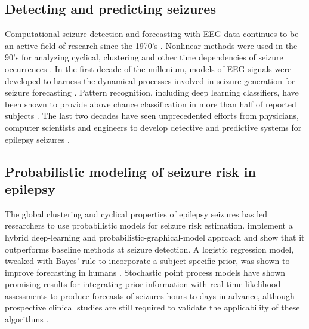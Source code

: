 \subsection{Detecting and predicting seizures}
Computational seizure detection and forecasting with EEG data continues to be an active field of research since the 1970's \cite{mormann2007seizure, kuhlmann2018seizure}. Nonlinear methods were used in the 90's for analyzing cyclical, clustering and other time dependencies of seizure occurrences \cite{iasemidis1994time}. In the first decade of the millenium, models of EEG signals were developed to harness the dynamical processes involved in seizure generation for seizure forecasting \cite{kalitzin2005electrical}. Pattern recognition, including deep learning classifiers, have been shown to provide above chance classification in more than half of reported subjects \cite{mirowski2008comparing,mormann2016seizure}. The last two decades have seen unprecedented efforts from physicians, computer scientists and engineers to develop detective and predictive systems for epilepsy seizures \cite{jirsa2017virtual,nejedly2019deep, maimaiti2021overview}.

\subsection{Probabilistic modeling of seizure risk in epilepsy}
The global clustering and cyclical properties of epilepsy seizures has led researchers to use probabilistic models for seizure risk estimation.
\citet{craley2019integrating} implement a hybrid deep-learning and probabilistic-graphical-model approach and show that it outperforms baseline methods at seizure detection. A logistic regression model, tweaked with Bayes' rule to incorporate a subject-specific prior, was shown to improve forecasting in humans \cite{karoly2017circadian}. Stochastic point process models have shown promising results for integrating prior information with real-time likelihood assessments to produce forecasts of seizures hours to days in advance, although prospective clinical studies are still required to validate the applicability of these algorithms \cite{proix2021forecasting}.

